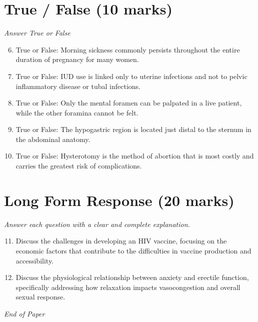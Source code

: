 \documentclass[12pt]{article}
\begin{document}
\section*{True / False (10 marks)}
\textit{Answer True or False}
\begin{enumerate}[label=\arabic*.]
\setcounter{enumi}{5}
\item True or False: Morning sickness commonly persists throughout the entire duration of pregnancy for many women.
\item True or False: IUD use is linked only to uterine infections and not to pelvic inflammatory disease or tubal infections.
\item True or False: Only the mental foramen can be palpated in a live patient, while the other foramina cannot be felt.
\item True or False: The hypogastric region is located just distal to the sternum in the abdominal anatomy.
\item True or False: Hysterotomy is the method of abortion that is most costly and carries the greatest risk of complications.
\end{enumerate}

\section*{Long Form Response (20 marks)}
\textit{Answer each question with a clear and complete explanation.}
\begin{enumerate}[label=\arabic*.]
\setcounter{enumi}{10}
\item Discuss the challenges in developing an HIV vaccine, focusing on the economic factors that contribute to the difficulties in vaccine production and accessibility.
\item Discuss the physiological relationship between anxiety and erectile function, specifically addressing how relaxation impacts vasocongestion and overall sexual response.
\end{enumerate}

\vfill
\noindent\textit{End of Paper}
\end{document}
